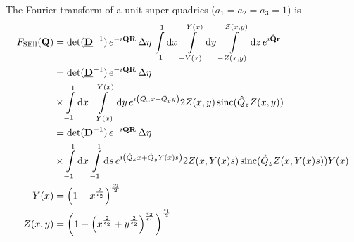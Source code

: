 The Fourier transform of a unit super-quadrics ($a_1=a_2=a_3=1$) is
\begin{align}\label{eq:FTsuperellipsoid}
  F_\mathrm{SEll}(\B{Q}) &=
\det(\M{D}^{-1})\, e^{-\imath\B{QR}}\, \Delta\eta\, \int\limits_{-1}^1
\mathrm{d}x\, \int\limits_{-Y(x)}^{Y(x)} \mathrm{d}y\,  \int\limits_{-Z(x,y)}^{Z(x,y)} \mathrm{d}z \,
e^{\imath\B{\hat{Q}r}} \nonumber \\
 &=
\det(\M{D}^{-1})\, e^{-\imath\B{QR}}\, \Delta\eta\,   \\
& \times \int\limits_{-1}^1
\mathrm{d}x\, \int\limits_{-Y(x)}^{Y(x)} \mathrm{d}y\,
e^{\imath\left(\hat{Q}_xx+\hat{Q}_yy\right)} 2Z(x,y)\operatorname{sinc}(\hat{Q}_z Z(x,y))\nonumber \\
&= \det(\M{D}^{-1})\, e^{-\imath\B{QR}}\, \Delta\eta\, \label{eq:superellipsoid_IQ} \\
& \times \int\limits_{-1}^1
\mathrm{d}x\, \int\limits_{-1}^{1} \mathrm{d}s\,
e^{\imath\left(\hat{Q}_xx+\hat{Q}_yY(x)s\right)} 2Z(x,Y(x)s)\operatorname{sinc}(\hat{Q}_z Z(x,Y(x)s))Y(x)\nonumber \\
Y(x) &= \left(1-x^{\frac{2}{\epsilon_2}}\right)^{\frac{\epsilon_2}{2}}\\
Z(x,y) &= \left(1-\left(x^{\frac{2}{\epsilon_2}}+y^{\frac{2}{\epsilon_2}}\right)^{\frac{\epsilon_2}{\epsilon_1}}\right)^{\frac{\epsilon_1}{2}}
\end{align}

